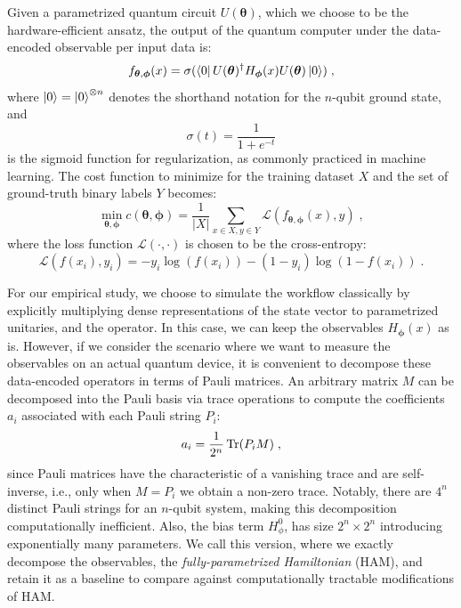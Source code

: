 \documentclass[../main.tex]{subfiles}
\begin{document}
Given a parametrized quantum circuit $U(\bm{\theta})$, which we choose to be the hardware-efficient ansatz, the output of the quantum computer under the data-encoded observable per input data is:
\begin{equation}
    f_{\bm{\theta},\bm{\phi}}(x) = \sigma(\bra{0} U(\bm{\theta})^\dagger H_{\bm{\phi}}(x) U(\bm{\theta})\ket{0}) \; ,
\end{equation} where $\ket{0} = \ket{0}^{\otimes n}$ denotes the shorthand notation for the $n$-qubit ground state, and
\begin{equation}
    \sigma(t) = \frac{1}{1 + e^{-t}}
\end{equation} is the sigmoid function for regularization, as commonly practiced in machine learning.
The cost function to minimize for the training dataset $X$ and the set of ground-truth binary labels $Y$ becomes:
\begin{equation}
    \min_{\bm{\theta},\bm{\phi}} c(\bm{\theta},\bm{\phi}) = \frac{1}{|X|} \sum_{x \in X, y \in Y} \mathcal{L}(f_{\bm{\theta},\bm{\phi}}(x), y) \; , 
\end{equation} where the loss function $\mathcal{L}(\cdot, \cdot)$ is chosen to be the cross-entropy: \begin{equation}
    \mathcal{L}(f(x_i),y_i) = -y_i \log(f(x_i)) - (1-y_i) \log(1-f(x_i)) \; .
\end{equation}

For our empirical study, we choose to simulate the workflow classically by explicitly multiplying dense representations of the state vector to parametrized unitaries, and the operator. In this case, we can keep the observables $H_{\bm{\phi}}(x)$ as is. However, if we consider the scenario where we want to measure the observables on an actual quantum device, it is convenient to decompose these data-encoded operators in terms of Pauli matrices. An arbitrary matrix $M$ can be decomposed into the Pauli basis via trace operations to compute the coefficients $a_i$ associated with each Pauli string $P_i$: 
\begin{equation} 
    a_i = \frac{1}{2^n} \Tr (P_i M) \; , 
\end{equation} since Pauli matrices have the characteristic of a vanishing trace and are self-inverse, i.e., only when $M = P_i$ we obtain a non-zero trace. Notably, there are $4^n$ distinct Pauli strings for an $n$-qubit system, making this decomposition computationally inefficient. Also, the bias term $H_\phi^0$, has size $2^n \times 2^n$ introducing exponentially many parameters. We call this version, where we exactly decompose the observables, the \textit{fully-parametrized Hamiltonian} (HAM), and retain it as a baseline to compare against computationally tractable modifications of HAM.
\end{document}
